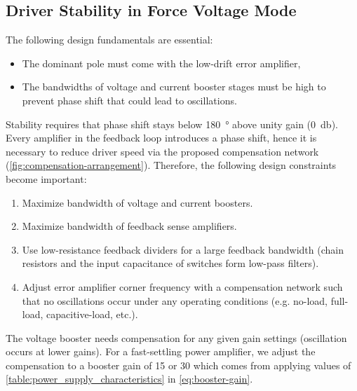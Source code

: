 \subsection{Driver Stability in Force Voltage Mode}
\label{subsec:stability-force-voltage-mode}

The following design fundamentals are essential:

\begin{itemize}[topsep=8pt,itemsep=4pt,partopsep=4pt, parsep=4pt]

    \item
    The dominant pole must come with the low-drift error amplifier,

    \item
    The bandwidths of voltage and current booster stages must be high to
    prevent phase shift that could lead to oscillations.

\end{itemize}

Stability requires that phase shift stays below \SI{180}{\degree} above unity gain
(\SI{0}{\decibel}).
Every amplifier in the feedback loop introduces a phase shift, hence it is
necessary to reduce driver speed via the proposed compensation network
(\autoref{fig:compensation-arrangement}).
Therefore, the following design constraints become important:

\begin{enumerate}[topsep=8pt,itemsep=4pt,partopsep=4pt, parsep=4pt]
    \item Maximize bandwidth of voltage and current boosters.
    \item Maximize bandwidth of feedback sense amplifiers.
    \item Use low-resistance feedback dividers for a large feedback
    bandwidth (chain resistors and the input capacitance of switches form
    low-pass filters).
    \item Adjust error amplifier corner frequency with a compensation network
    such that no oscillations occur under any operating conditions
    (e.g. no-load, full-load, capacitive-load, etc.).
\end{enumerate}

The voltage booster needs compensation for any given
gain settings (oscillation occurs at lower gains).
For a fast-settling power amplifier, we adjust the compensation to a booster
gain of 15 or 30 which comes from applying values of
\autoref{table:power_supply_characteristics} in
\autoref{eq:booster-gain}.

